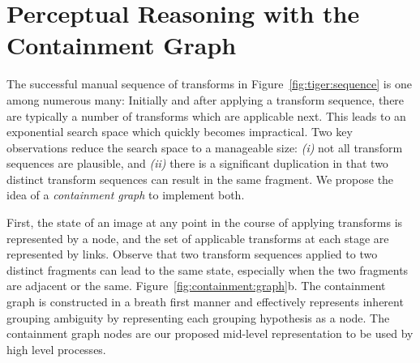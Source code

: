 \section{Perceptual Reasoning with the Containment Graph}
\label{sec:reasoning}
The successful manual sequence of transforms in Figure~\ref{fig:tiger:sequence} is one among numerous many: Initially and after applying a transform sequence, there are typically a number of transforms which are applicable next. This leads to an exponential search space which quickly becomes impractical. Two key observations reduce the search space to a manageable size: {\em (i)} not all transform sequences are plausible, and {\em (ii)} there is a significant duplication in that two distinct transform sequences can result in the same fragment. We propose the idea of a {\em containment graph} to implement both. 

First, the state of an image at any point in the course of applying transforms is represented by a node, and the set of applicable transforms at each stage are represented by links. Observe that two transform sequences applied to two distinct fragments can lead to the same state, especially when the two fragments are adjacent or the same. Figure~\ref{fig:containment:graph}b. The containment graph is constructed in a breath first manner and effectively represents inherent grouping ambiguity by representing each grouping hypothesis as a node. The containment graph nodes are our proposed mid-level representation to be used by high level processes.

